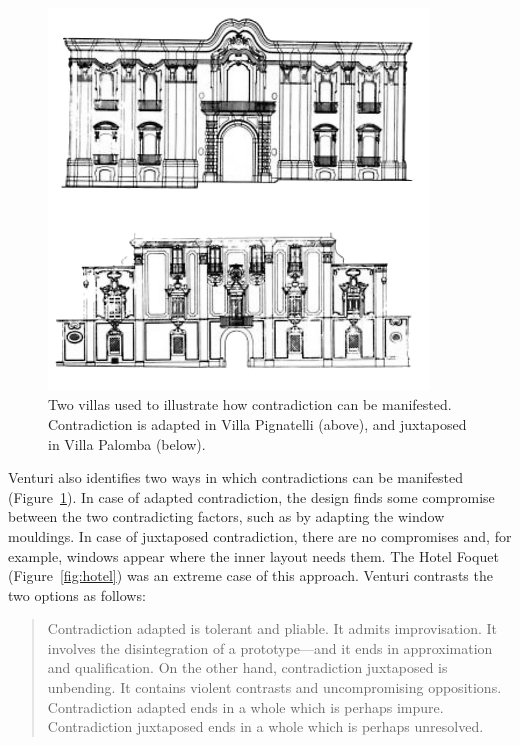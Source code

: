 \begin{figure}
\centering
\begin{minipage}[t]{.5\textwidth}%
\vspace{0em}
\raggedleft
\vspace{-1em}
\includegraphics[width=0.9\textwidth]{fig/villas.png}
\end{minipage}\quad\quad
\begin{minipage}[t]{.4\textwidth}
\caption{Two villas used to illustrate how contradiction can be manifested. Contradiction is
  adapted in Villa Pignatelli (above), and juxtaposed in Villa Palomba (below).}
\label{fig:villas}
\end{minipage}
\end{figure}

Venturi also identifies two ways in which contradictions can be manifested (Figure~\ref{fig:villas}).
In case of adapted contradiction, the design finds some compromise between the two contradicting
factors, such as by adapting the window mouldings. In case of juxtaposed contradiction, there are
no compromises and, for example, windows appear where the inner layout needs them. The Hotel
Foquet (Figure~\ref{fig:hotel}) was an extreme case of this approach. Venturi contrasts the two
options as follows:

\begin{quote}
Contradiction adapted is tolerant and pliable. It admits improvisation. It involves the
disintegration of a prototype---and it ends in approximation and qualification. On the other
hand, contradiction juxtaposed is unbending. It contains violent contrasts and uncompromising
oppositions. Contradiction adapted ends in a whole which is perhaps impure. Contradiction
juxtaposed ends in a whole which is perhaps unresolved.
\end{quote}

